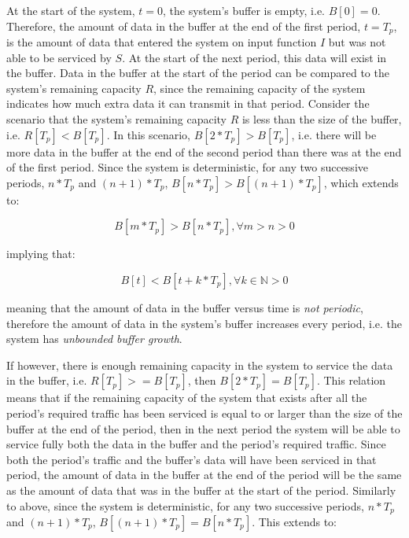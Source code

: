 At the start of the system, $t=0$, the system's buffer is empty,
i.e.  $B[0] = 0$.  Therefore, the amount of data in the buffer
at the end of the first period, $t=T_p$, is the amount of data
that entered the system on input function $I$ but was not able
to be serviced by $S$.  At the start of the next period, this
data will exist in the buffer.  Data in the buffer at the start of the
period can be compared to the system's remaining capacity $R$,
since the remaining capacity of the system indicates how much extra
data it can transmit in that period.  Consider the scenario that the
system's remaining capacity $R$ is less than the size of the
buffer, i.e. $R[T_p] < B[T_p]$.  In this scenario,
$B[2*T_p] > B[T_p]$, i.e. there will be more data in the buffer
at the end of the second period than there was at the end of the first
period.  Since the system is deterministic, for any two successive
periods, $n*T_p$ and $(n+1)*T_p$, $B[n*T_p] >
B[(n+1)*T_p]$, which extends to:

\begin{equation}
   B[m*T_p] > B[n*T_p], \forall m>n>0
\end{equation}

implying that:

\begin{equation}
   B[t] < B[t + k*T_p], \forall k \in \mathbb{N} > 0
\end{equation}

meaning that the amount of data in the buffer versus time is \emph{not
periodic}, therefore the amount of data in the system's buffer
increases every period, i.e. the system has \emph{unbounded buffer growth}.

If however, there is enough remaining capacity in the system to
service the data in the buffer, i.e. $R[T_p] >= B[T_p]$, then
$B[2*T_p] = B[T_p]$.  This relation means that if the remaining
capacity of the system that exists after all the period's required
traffic has been serviced is equal to or larger than the size of the
buffer at the end of the period, then in the next period the system
will be able to service fully both the data in the buffer and the
period's required traffic.  Since both the period's traffic and the
buffer's data will have been serviced in that period, the amount of
data in the buffer at the end of the period will be the same as the
amount of data that was in the buffer at the start of the
period. Similarly to above, since the system is deterministic, for any
two successive periods, $n*T_p$ and $(n+1)*T_p$,
$B[(n+1)*T_p] = B[n*T_p]$.  This extends to:

